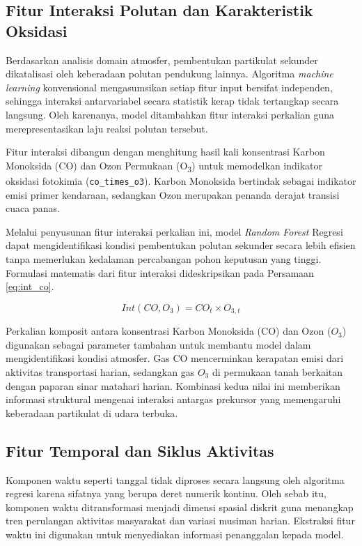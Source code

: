 \subsection{Fitur Interaksi Polutan dan Karakteristik Oksidasi}

Berdasarkan analisis domain atmosfer, pembentukan partikulat sekunder dikatalisasi oleh keberadaan polutan pendukung lainnya. Algoritma \textit{machine learning} konvensional mengasumsikan setiap fitur input bersifat independen, sehingga interaksi antarvariabel secara statistik kerap tidak tertangkap secara langsung. Oleh karenanya, model ditambahkan fitur interaksi perkalian guna merepresentasikan laju reaksi polutan tersebut.

Fitur interaksi dibangun dengan menghitung hasil kali konsentrasi Karbon Monoksida (CO) dan Ozon Permukaan (O\textsubscript{3}) untuk memodelkan indikator oksidasi fotokimia (\texttt{co\_times\_o3}). Karbon Monoksida bertindak sebagai indikator emisi primer kendaraan, sedangkan Ozon merupakan penanda derajat transisi cuaca panas. 

Melalui penyusunan fitur interaksi perkalian ini, model \textit{Random Forest} Regresi dapat mengidentifikasi kondisi pembentukan polutan sekunder secara lebih efisien tanpa memerlukan kedalaman percabangan pohon keputusan yang tinggi. Formulasi matematis dari fitur interaksi dideskripsikan pada Persamaan \ref{eq:int_co}.

\begin{equation}
    Int(CO, O_3) = CO_t \times O_{3,t}
    \label{eq:int_co}
\end{equation}

\newpage

Perkalian komposit antara konsentrasi Karbon Monoksida (CO) dan Ozon ($O_3$) digunakan sebagai parameter tambahan untuk membantu model dalam mengidentifikasi kondisi atmosfer. Gas CO mencerminkan kerapatan emisi dari aktivitas transportasi harian, sedangkan gas $O_3$ di permukaan tanah berkaitan dengan paparan sinar matahari harian. Kombinasi kedua nilai ini memberikan informasi struktural mengenai interaksi antargas prekursor yang memengaruhi keberadaan partikulat di udara terbuka.

\subsection{Fitur Temporal dan Siklus Aktivitas}

Komponen waktu seperti tanggal tidak diproses secara langsung oleh algoritma regresi karena sifatnya yang berupa deret numerik kontinu. Oleh sebab itu, komponen waktu ditransformasi menjadi dimensi spasial diskrit guna menangkap tren perulangan aktivitas masyarakat dan variasi musiman harian. Ekstraksi fitur waktu ini digunakan untuk menyediakan informasi penanggalan kepada model.

